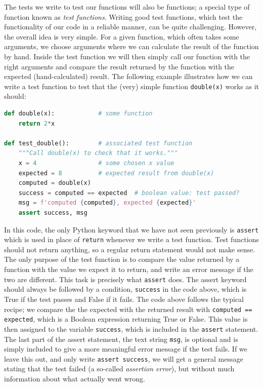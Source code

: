 \documentclass[graybox,envcountchap,sectrefs,final]{svmonodo}
\begin{document}
The tests we write to test our functions will also be functions; a special type of function known as \emph{test functions}.
Writing good test functions, which test the functionality of our code in a reliable manner, can be quite challenging.
However, the overall idea is very simple. For a given function, which often takes some arguments, we choose
arguments where we can calculate the result of the function by hand. Inside the test function we will then simply
call our function with the right arguments and compare the result returned by the function
with the expected (hand-calculated) result. The following example illustrates how we can write a
test function to test that the (very) simple function \texttt{double(x)} works as it should:
\begin{lstlisting}[language=Python,style=blue1]
def double(x):            # some function
    return 2*x

def test_double():        # associated test function
    """Call double(x) to check that it works."""
    x = 4                 # some chosen x value
    expected = 8          # expected result from double(x)
    computed = double(x)
    success = computed == expected  # boolean value: test passed?
    msg = f'computed {computed}, expected {expected}'
    assert success, msg
\end{lstlisting}
In this code, the only Python keyword that we have not seen previously is \texttt{assert} which is used in place of
\texttt{return} whenever we write a test function. Test functions should not return anything, so a regular
return statement would not make sense. The only purpose of the test function
is to compare the value returned by a function with the value
we expect it to return, and write an error message if the two are different. This task is precisely what \texttt{assert} does. The
assert keyword should always be followed by a condition, \texttt{success} in the code above, which is True if the test passes and
False if it fails. The code above follows the typical recipe; we compare the the expected with the returned
result with \texttt{computed == expected}, which is a Boolean expression returning True or False. This value is then assigned
to the variable \texttt{success}, which is included in the \texttt{assert} statement. The last part of the assert statement, the text
string \texttt{msg}, is
optional and is simply included to give a more meaningful error message if the test fails. If we leave this out, and
only write \texttt{assert success}, we will get a general message stating that the test failed (a so-called \emph{assertion error}),
but without much information about what actually went wrong.
\end{document}
